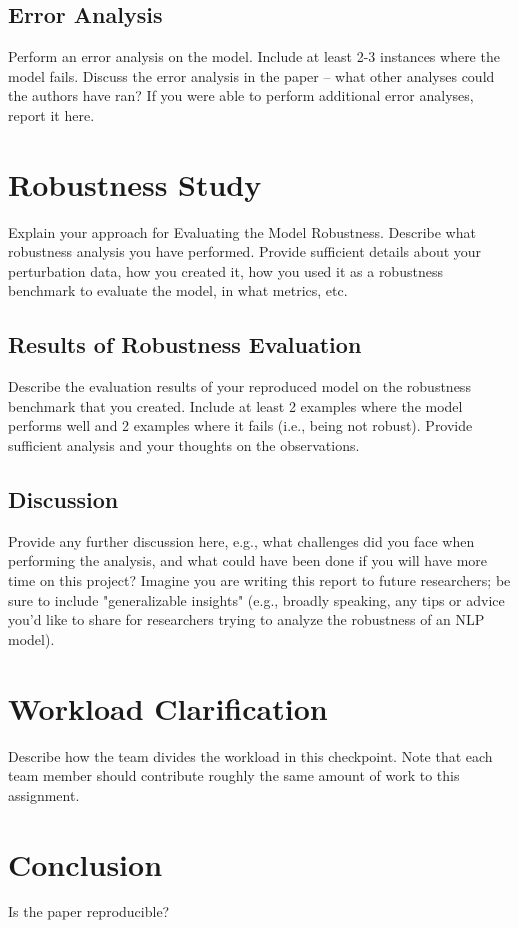 \documentclass[11pt,a4paper]{article}
\begin{document}
\subsection{Error Analysis}
Perform an error analysis on the model. Include at least 2-3 instances where the model fails. Discuss the error analysis in the paper -- what other analyses could the authors have ran? If you were able to perform additional error analyses, report it here.

\section{Robustness Study}
Explain your approach for Evaluating the Model Robustness. Describe what robustness analysis you have performed. Provide sufficient details about your perturbation data, how you created it, how you used it as a robustness benchmark to evaluate the model, in what metrics, etc.

\subsection{Results of Robustness Evaluation}
Describe the evaluation results of your reproduced model on the robustness benchmark that you created. Include at least 2 examples where the model performs well and 2 examples where it fails (i.e., being not robust). Provide sufficient analysis and your thoughts on the observations.

\subsection{Discussion} 
Provide any further discussion here, e.g., what challenges did you face when performing the analysis, and what could have been done if you will have more time on this project? Imagine you are writing this report to future researchers; be sure to include "generalizable insights" (e.g., broadly speaking, any tips or advice you'd like to share for researchers trying to analyze the robustness of an NLP model).

\section{Workload Clarification}
Describe how  the team divides the workload in this checkpoint. Note that each team member should contribute roughly the same amount of work to this assignment.

\section{Conclusion}
Is the paper reproducible?
\end{document}
